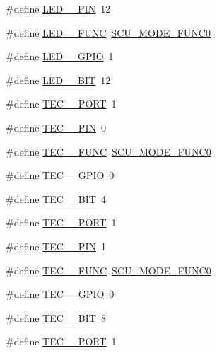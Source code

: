 \begin{DoxyCompactItemize}
\#define \hyperlink{group__samples_ga5ea98da36d05b171b54c342bcf4a35f7}{L\+E\+D\+\_\+\_\+\+P\+IN}~12
\item 
\#define \hyperlink{group__samples_gab0622590a012697e9e5d95cff50cad26}{L\+E\+D\+\_\+\_\+\+F\+U\+NC}~\hyperlink{group___s_c_u__18_x_x__43_x_x_gaec79b551b98008d8986e719926f254bc}{S\+C\+U\+\_\+\+M\+O\+D\+E\+\_\+\+F\+U\+N\+C0}
\item 
\#define \hyperlink{group__samples_gadd2d323f8eb544f1ab84762f94e44bd4}{L\+E\+D\+\_\+\_\+\+G\+P\+IO}~1
\item 
\#define \hyperlink{group__samples_gab9b4d582a53ac2329ac4b7527561fa80}{L\+E\+D\+\_\+\_\+\+B\+IT}~12
\item 
\#define \hyperlink{group__samples_ga8646ae3b4a7ad2be7610ff81e3d73c0f}{T\+E\+C\+\_\+\_\+\+P\+O\+RT}~1
\item 
\#define \hyperlink{group__samples_gabbb083565fd13306450dfc5fdcf934c0}{T\+E\+C\+\_\+\_\+\+P\+IN}~0
\item 
\#define \hyperlink{group__samples_ga8ae57a649603bf7f33d0e896b034bd41}{T\+E\+C\+\_\+\_\+\+F\+U\+NC}~\hyperlink{group___s_c_u__18_x_x__43_x_x_gaec79b551b98008d8986e719926f254bc}{S\+C\+U\+\_\+\+M\+O\+D\+E\+\_\+\+F\+U\+N\+C0}
\item 
\#define \hyperlink{group__samples_ga8731b2048404c4c819291bebfc6a1e6a}{T\+E\+C\+\_\+\_\+\+G\+P\+IO}~0
\item 
\#define \hyperlink{group__samples_ga0f27cf5eeffd9d5f04a6a4c57bbdbae7}{T\+E\+C\+\_\+\_\+\+B\+IT}~4
\item 
\#define \hyperlink{group__samples_ga6dd94a0728943a6bb0706bae78aa529f}{T\+E\+C\+\_\+\_\+\+P\+O\+RT}~1
\item 
\#define \hyperlink{group__samples_gae23ce57ac09e13a68a782d5bb61c8a30}{T\+E\+C\+\_\+\_\+\+P\+IN}~1
\item 
\#define \hyperlink{group__samples_gae81d46d99322159370646c09d852af70}{T\+E\+C\+\_\+\_\+\+F\+U\+NC}~\hyperlink{group___s_c_u__18_x_x__43_x_x_gaec79b551b98008d8986e719926f254bc}{S\+C\+U\+\_\+\+M\+O\+D\+E\+\_\+\+F\+U\+N\+C0}
\item 
\#define \hyperlink{group__samples_ga83ce1f0ab51ee7b4df55e629cdfc52d9}{T\+E\+C\+\_\+\_\+\+G\+P\+IO}~0
\item 
\#define \hyperlink{group__samples_gaed7549a304721e36693036c8a289ff4c}{T\+E\+C\+\_\+\_\+\+B\+IT}~8
\item 
\#define \hyperlink{group__samples_gac948c6a2caf0ef5cde7fa2c2e94fddb0}{T\+E\+C\+\_\+\_\+\+P\+O\+RT}~1
\item 

\end{DoxyCompactItemize}

